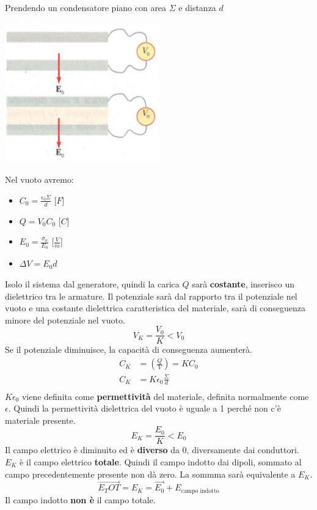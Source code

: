 \documentclass[a4paper, 12pt]{book}
\theoremstyle{plain}
\begin{document}
Prendendo un condensatore piano con area $\Sigma$ e distanza $d$
\begin{center}
    \includegraphics[width=0.5\textwidth]{condensatore_con_lastra.png}
\end{center}
Nel vuoto avremo:
\begin{itemize}
    \item $C_0 = \frac{\epsilon_0 \Sigma}{d}$ [$F$]
    \item $Q = V_0 C_0$ [$C$]
    \item $E_0 = \frac{\sigma_0}{E_0}$ [$\frac{V}{m}$]
    \item $\Delta V = E_0 d$
\end{itemize}
Isolo il sistema dal generatore, quindi la carica $Q$ sarà \textbf{costante}, inserisco un dielettrico tra le armature. Il potenziale 
sarà dal rapporto tra il potenziale nel vuoto e una costante dielettrica caratteristica del materiale, sarà di conseguenza minore del potenziale 
nel vuoto. 
\[
    V_K = \frac{V_0}{K} < V_0
\]
Se il potenziale diminuisce, la capacità di conseguenza aumenterà.
\[
    \begin{split}
        C_K &= (\frac{Q}{V}) = K C_0 \\
        C_K &= K \epsilon_0 \frac{\Sigma}{d} \\
    \end{split}
\]
$K \epsilon_0$ viene definita come \textbf{permettività} del materiale, definita normalmente come $\epsilon$. Quindi la permettività 
dielettrica del vuoto è uguale a 1 perché non c'è materiale presente.
\[
    E_K = \frac{E_0}{K} < E_0
\]
Il campo elettrico è diminuito ed è \textbf{diverso} da 0, diversamente dai conduttori. $E_K$ è il campo elettrico \textbf{totale}.
Quindi il campo indotto dai dipoli, sommato al campo precedentemente presente non dà zero. La sommma sarà equivalente a $E_K$. 
\[
    \vec{E_TOT} = E_K = \vec{E_0} + E_{\textrm{campo indotto}}
\]
Il campo indotto \textbf{non è} il campo totale.
\end{document}
